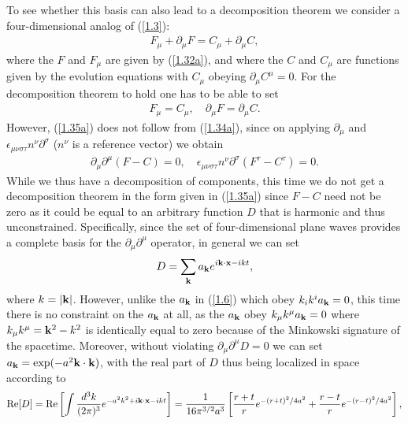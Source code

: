 \documentclass[aps,onecolumn,10pt]{revtex4}
\numberwithin{equation}{section}
\numberwithin{equation}{section}
\begin{document}
To see whether this basis can also lead to a decomposition theorem we consider a four-dimensional analog of (\ref{1.3}): 
%
\begin{eqnarray}
F_{\mu}+\partial_{\mu}F=C_{\mu}+\partial_{\mu}C,
\label{1.34a}
\end{eqnarray}
%
where the $F$ and $F_{\mu}$ are given by (\ref{1.32a}), and where the $C$ and $C_{\mu}$ are functions given by the evolution equations with $C_{\mu}$ obeying  $\partial_{\mu}C^{\mu}=0$. For the decomposition theorem to hold one has to be able to set
%
\begin{eqnarray}
F_{\mu}= C_{\mu},\quad \partial_{\mu}F=\partial_{\mu}C.
\label{1.35a}
\end{eqnarray}
%
However, (\ref{1.35a}) does not follow from (\ref{1.34a}), since on applying $\partial_{\mu}$  and $\epsilon_{\mu\nu\sigma\tau}n^{\nu}\partial^{\sigma}$ ($n^{\nu}$ is a reference vector) we obtain
%
\begin{eqnarray}
\partial_{\mu}\partial^{\mu}(F-C)=0,\quad \epsilon_{\mu\nu\sigma\tau}n^{\nu}\partial^{\sigma}(F^{\tau}-C^{\tau})=0.
\label{1.36a}
\end{eqnarray}
%
While we thus have a decomposition of components, this time we do not get a decomposition theorem in the form given in (\ref{1.35a}) since $F-C$ need not be zero as it could  be equal to an arbitrary function $D$ that is harmonic and thus unconstrained. Specifically, since the set of four-dimensional plane waves provides a complete basis for the $\partial_{\mu}\partial^{\mu}$ operator, in general we can set  
%
\begin{eqnarray}
D=\sum _{\bf k}a_{\bf k}e^{i\textbf{k}\cdot \textbf{x}-ikt},
\label{1.37a}
\end{eqnarray}
%
where $k=|{\bf k}|$. However, unlike the $a_{\bf k}$ in (\ref{1.6}) which obey $k_ik^ia_{\bf k}=0$, this time there is no constraint on the $a_{\bf k}$ at all, as the $a_{\bf k}$ obey $k_{\mu}k^{\mu}a_{\bf k}=0$ where $k_{\mu}k^{\mu}={\bf k}^2-k^2$ is identically equal to zero because of the Minkowski signature of the spacetime. Moreover, without violating $\partial_{\mu}\partial^{\mu}D=0$ we can set $a_{\bf k}=\exp(-a^2{\bf k}\cdot{\bf k})$, with the real part of $D$ thus being localized in space according to
%
\begin{eqnarray}
{\rm Re}[D]={\rm Re}\left[\int \frac{d^3k}{(2\pi)^3}e^{-a^2k^2+i\textbf{k}\cdot \textbf{x}-ikt}\right]=
\frac{1}{16\pi^{3/2}a^3}\left[\frac{r+t}{r}e^{-(r+t)^2/4a^2}+\frac{r-t}{r}e^{-(r-t)^2/4a^2}\right],
\label{1.38a}
\end{eqnarray}
\end{document}
